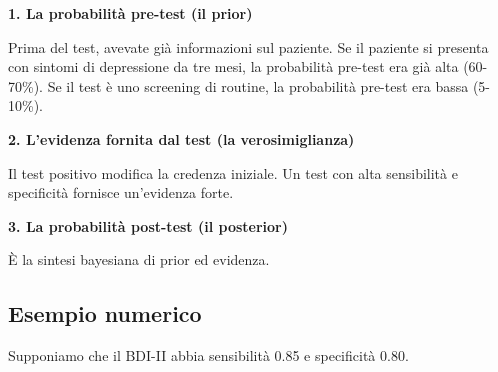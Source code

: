 \documentclass[
  italian,
  letterpaper,
  a4paper,
  11pt,
  open=any]{scrbook}
\theoremstyle{plain}
\theoremstyle{definition}
\theoremstyle{definition}
\theoremstyle{remark}
\begin{document}
\textbf{1. La probabilità pre-test (il prior)}

Prima del test, avevate già informazioni sul paziente. Se il paziente si
presenta con sintomi di depressione da tre mesi, la probabilità pre-test
era già alta (60-70\%). Se il test è uno screening di routine, la
probabilità pre-test era bassa (5-10\%).

\textbf{2. L'evidenza fornita dal test (la verosimiglianza)}

Il test positivo modifica la credenza iniziale. Un test con alta
sensibilità e specificità fornisce un'evidenza forte.

\textbf{3. La probabilità post-test (il posterior)}

È la sintesi bayesiana di prior ed evidenza.

\subsection{Esempio numerico}\label{esempio-numerico}

Supponiamo che il BDI-II abbia sensibilità 0.85 e specificità 0.80.
\end{document}
